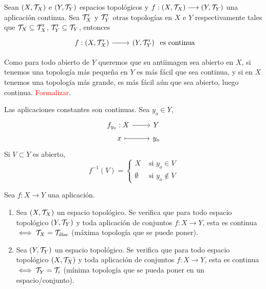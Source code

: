 \begin{prop}
    Sean $(X, \mathcal{T}_X)$ e $(Y, \mathcal{T}_Y)$ espacios topol\'ogicos y $f: (X, \mathcal{T}_X) \longrightarrow(Y, \mathcal{T}_Y)$ una aplicaci\'on continua. Sea $\mathcal{T}_X'$ y $\mathcal{T}_Y'$ otras topolog\'ias en $X$ e $Y$ respectivamente tales que $\mathcal{T}_X \subseteq \mathcal{T}_X'$, $\mathcal{T}_Y' \subseteq \mathcal{T}_Y$, entonces
    $$\bt f : (X, \mc T_X') \rar & (Y, \mc T_Y') \et \text{ es continua}$$
\end{prop}
\begin{dem}
    Como para todo abierto de $Y$ queremos que su antiimagen sea abierto en $X$, si tenemos una topolog\'ia m\'as pequeña en $Y$ es m\'as f\'acil que sea continua, y si en $X$ tenemos una topolog\'ia m\'as grande, es m\'as f\'acil a\'un que sea abierto, luego continua. \textcolor{red}{Formalizar}. 
\end{dem}
\begin{obs}
    Las aplicaciones constantes son continuas. Sea $y_o \in Y$, 
    $$\bt f_{y_o}: X \rar & Y \\[-5mm] \, \, x \rarmaps & y_o \et$$
    Si $V\subset Y$ es abierto,
    $$f^{-1}(V) = \begin{cases}
        X & \text{ si } y_o \in V \\ \emptyset & \text{ si } y_o \nin V
    \end{cases}$$
\end{obs}

\begin{prop}
Sea $f: X \longrightarrow Y$ una aplicación.
\begin{enumerate}
    \item Sea $(X, \mathcal{T}_X)$ un espacio topológico. Se verifica que para todo espacio topológico $(Y, \mathcal{T}_Y)$ y toda aplicación de conjuntos $f: X \longrightarrow Y$, esta es continua $\iff \mathcal{T}_X = \mathcal{T}_{\text{disc}}$ (máxima topología que se puede poner).
    \item Sea $(Y, \mathcal{T}_Y)$ un espacio topológico. Se verifica que para todo espacio topológico $(X, \mathcal{T}_X)$ y toda aplicación de conjuntos $f: X \longrightarrow Y$, esta es continua $\iff \mathcal{T}_Y = \mathcal{T}_i$ (mínima topología que se pueda poner en un espacio/conjunto).
\end{enumerate}
\end{prop}

